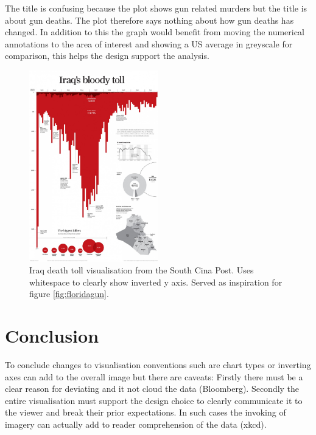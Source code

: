 \documentclass[a4paper,10pt, twocolumn]{article}
\begin{document}
The title is confusing because the plot shows gun related murders but the title is about gun deaths. The plot therefore says nothing about how gun deaths has changed. In addition to this the graph would benefit from moving the numerical annotations to the area of interest and showing a US average in greyscale for comparison, this helps the design support the analysis. 
\begin{figure}[htbp]
	\includegraphics[width=0.5\textwidth]{iraqdeaths.jpg}
	\centering
	\caption{Iraq death toll visualisation from the South Cina Post. Uses whitespace to clearly show inverted y axis. Served as inspiration for figure \ref{fig:floridagun}. \cite{iraqdeaths}}
	\label{fig:iraqdeaths}
\end{figure} 

\section{Conclusion}
To conclude changes to visualisation conventions such are chart types or inverting axes can add to the overall image but there are caveats: Firstly there must be a clear reason for deviating and it not cloud the data (Bloomberg). Secondly the entire visualisation must support the design choice to clearly communicate it to the viewer and break their prior expectations. In such cases the invoking of imagery can actually add to reader comprehension of the data (xkcd). 

\small


\end{document}
